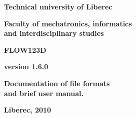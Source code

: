 \documentclass[12pt,a4paper]{report}
\begin{document}
\thispagestyle{empty}
\begin{center}
\noindent 
\textbf{\LARGE{
  Technical university of Liberec
}}

\vspace{2ex}
\textbf{\LARGE{
  Faculty of mechatronics, informatics\\
  and interdisciplinary studies
}}

\vspace{160pt}

\textbf{\Huge{
FLOW123D
}}

\vspace{1cm}
\textbf{\Large{
version 1.6.0
}}

\vspace{1cm}

\textbf{\Large{
Documentation of file formats \\
and brief user manual.
}}


\vspace{10cm}

\noindent \textbf{\Large{Liberec, 2010}}
\end{center}
\noindent 

\noindent

 

 


 
  
   
\end{document}
